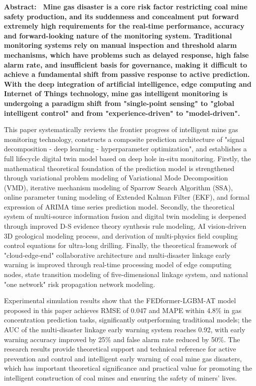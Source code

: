 \documentclass[twocolumn,a4paper]{ctexart}
\numberwithin{equation}{section}
\begin{document}
\noindent{}\bfseries Abstract:\ \normalfont
Mine gas disaster is a core risk factor restricting coal mine safety production, and its suddenness and concealment put forward extremely high requirements for the real-time performance, accuracy and forward-looking nature of the monitoring system. Traditional monitoring systems rely on manual inspection and threshold alarm mechanisms, which have problems such as delayed response, high false alarm rate, and insufficient basis for governance, making it difficult to achieve a fundamental shift from passive response to active prediction. With the deep integration of artificial intelligence, edge computing and Internet of Things technology, mine gas intelligent monitoring is undergoing a paradigm shift from "single-point sensing" to "global intelligent control" and from "experience-driven" to "model-driven".

This paper systematically reviews the frontier progress of intelligent mine gas monitoring technology, constructs a composite prediction architecture of "signal decomposition - deep learning - hyperparameter optimization", and establishes a full lifecycle digital twin model based on deep hole in-situ monitoring. Firstly, the mathematical theoretical foundation of the prediction model is strengthened through variational problem modeling of Variational Mode Decomposition (VMD), iterative mechanism modeling of Sparrow Search Algorithm (SSA), online parameter tuning modeling of Extended Kalman Filter (EKF), and formal expression of ARIMA time series prediction model. Secondly, the theoretical system of multi-source information fusion and digital twin modeling is deepened through improved D-S evidence theory synthesis rule modeling, AI vision-driven 3D geological modeling process, and derivation of multi-physics field coupling control equations for ultra-long drilling. Finally, the theoretical framework of "cloud-edge-end" collaborative architecture and multi-disaster linkage early warning is improved through real-time processing model of edge computing nodes, state transition modeling of five-dimensional linkage system, and national "one network" risk propagation network modeling.

Experimental simulation results show that the FEDformer-LGBM-AT model proposed in this paper achieves RMSE of 0.047 and MAPE within 4.8\% in gas concentration prediction tasks, significantly outperforming traditional models; the AUC of the multi-disaster linkage early warning system reaches 0.92, with early warning accuracy improved by 25\% and false alarm rate reduced by 50\%. The research results provide theoretical support and technical reference for active prevention and control and intelligent early warning of coal mine gas disasters, which has important theoretical significance and practical value for promoting the intelligent construction of coal mines and ensuring the safety of miners' lives.
\end{document}

